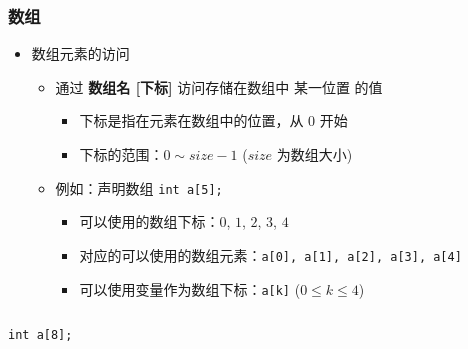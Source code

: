 \begin{frame}[fragile]
    \frametitle{数组}

    \begin{overlayarea}{\textwidth}{.55\textheight}
        \begin{itemize}
            \item 数组元素的访问

                \begin{itemize}
                    \item 通过 \textbf{数组名 [下标]} 访问存储在数组中 某一位置 的值
                        \begin{itemize}
                            \item 下标是指在元素在数组中的位置，从 $0$ 开始
                            \item 下标的范围：$0 \sim size - 1$ ($size$ 为数组大小)
                        \end{itemize}
                \end{itemize}

                \begin{itemize}
                    \item<2-> 例如：声明数组 \lstinline|int a[5];|
                        \begin{itemize}
                            \item 可以使用的数组下标：$0$, $1$, $2$, $3$, $4$
                            \item 对应的可以使用的数组元素：\lstinline|a[0], a[1], a[2], a[3], a[4]|
                            \item 可以使用变量作为数组下标：\lstinline|a[k]| ($0 \le k \le 4$)
                        \end{itemize}
                \end{itemize}
        \end{itemize}
    \end{overlayarea}

    \begin{columns}

        \lstinline|int a[8];|

    \end{columns}
\end{frame}

